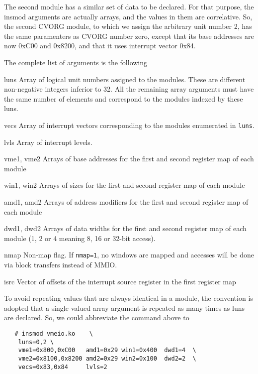 \documentclass{article}
\begin{document}
The second module has a similar set of data to be declared. For that
purpose, the insmod arguments are actually arrays, and the values in
them are correlative. So, the second CVORG module, to which we assign
the arbitrary unit number 2, has the same paramenters as CVORG number
zero, except that its base addresses are now 0xC00 and 0x8200, and that
it uses interrupt vector 0x84.

The complete list of arguments is the following
\begin{compactdesc}
\item[luns] Array of logical unit numbers assigned to the modules.
    These are different non-negative integers inferior to 32. All the
    remaining array arguments must have the same number of elements and
    correspond to the modules indexed by these luns.
\item[vecs] Array of interrupt vectors corresponding to the modules
    enumerated in \verb|luns|.
\item[lvls] Array of interrupt levels.
\item[vme1, vme2] Arrays of base addresses for the first and second
    register map of each module
\item[win1, win2] Arrays of sizes for the first and second register map
    of each module
\item[amd1, amd2] Arrays of address modifiers for the first and second 
    register map of each module
\item[dwd1, dwd2] Arrays of data widths for the first and second register map
    of each module (1, 2 or 4 meaning 8, 16 or 32-bit access).
\item[nmap] Non-map flag. If \verb|nmap=1|, no windows are mapped and
    accesses will be done via block transfers instead of MMIO.
\item[isrc] Vector of offsets of the interrupt source register in the
    first register map
\end{compactdesc}

To avoid repeating values that are always identical in a module, the
convention is adopted that a single-valued array argument is repeated as
many times as luns are declared. So, we could abbreviate the command
above to
\begin{Verbatim}
   # insmod vmeio.ko    \
	luns=0,2 \
	vme1=0x800,0xC00   amd1=0x29 win1=0x400  dwd1=4  \
	vme2=0x8100,0x8200 amd2=0x29 win2=0x100  dwd2=2  \
	vecs=0x83,0x84     lvls=2
\end{Verbatim}
\end{document}
